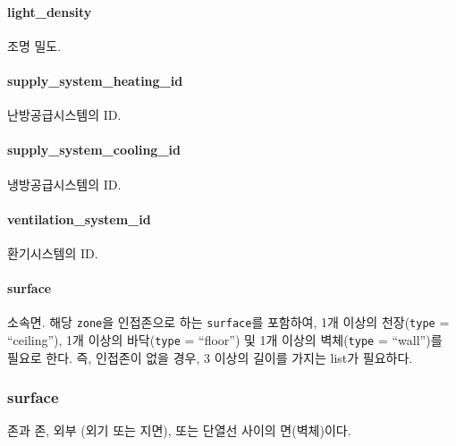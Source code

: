 \paragraph{light\_density} 조명 밀도.

\paragraph{supply\_system\_heating\_id} 난방공급시스템의 ID. 

\paragraph{supply\_system\_cooling\_id} 냉방공급시스템의 ID.

\paragraph{ventilation\_system\_id} 환기시스템의 ID.

\paragraph{surface} 소속면. 해당 \texttt{zone}을 인접존으로 하는 \texttt{surface}를 포함하여, 1개 이상의 천장(\texttt{type} = ``ceiling''), 1개 이상의 바닥(\texttt{type} = ``floor'') 및 1개 이상의 벽체(\texttt{type} = ``wall'')를 필요로 한다. 즉, 인접존이 없을 경우, 3 이상의 길이를 가지는 list가 필요하다.

\subsubsection{surface} \label{subsubsection:ioref:surface}
존과 존, 외부 (외기 또는 지면), 또는 단열선 사이의 면(벽체)이다.

